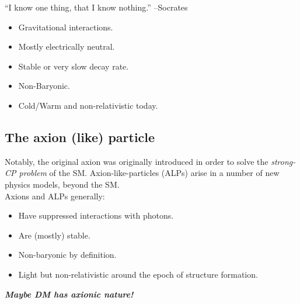 \documentclass[10pt,utf8,compress,xcolor=dvipsnames]{beamer}
\begin{document}
\begin{frame}{\insertsubsectionhead}
	\begin{center}
		``I know one thing,  that I know nothing.''
		\flushright --Socrates %
	\end{center}
	
	\begin{itemize}
		\item Gravitational interactions.
		\item Mostly electrically neutral.
		\item Stable or very slow decay rate. 
		\item Non-Baryonic.
		\item Cold/Warm and non-relativistic today.
	\end{itemize}
	
\end{frame}

\subsection{The axion (like) particle}
\begin{frame}{\insertsubsectionhead}
	Notably, the original axion was originally introduced in order to solve the {\em strong-CP problem} of the SM.
	Axion-like-particles (ALPs) arise in a number of new physics models, beyond the SM.  \\[0.5cm]
	
	Axions and ALPs generally:
	\begin{itemize}
		\item Have suppressed interactions with photons.
		\item Are (mostly) stable. 
		\item Non-baryonic by definition.
		\item Light but non-relativistic around the epoch of structure formation. 
		\pause\\[1cm]
	\end{itemize}
	
	\begin{center}
		{\bf \em Maybe DM has axionic nature!}	
	\end{center}
	
\end{frame}
\end{document}
